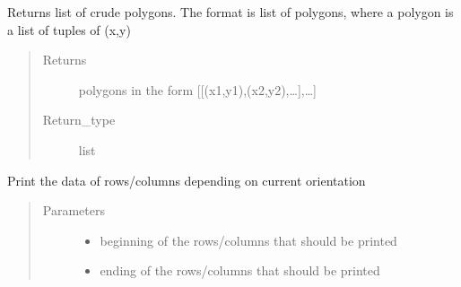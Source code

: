 \documentclass[a4paper,10pt,english]{sphinxmanual}
\begin{document}
\begin{fulllineitems}
\begin{fulllineitems}
\begin{quote}
\begin{description}
\end{description}\end{quote}

\end{fulllineitems}


\begin{fulllineitems}
\label{\detokenize{drc/drc:kppc.drc.kppc.drc.slcleaner.PyDrcSl.polygons}}
Returns list of crude polygons. The format is list of polygons, where a polygon is a list of tuples of (x,y)
\begin{quote}\begin{description}
\item[{Returns}] \leavevmode
polygons in the form {[}{[}(x1,y1),(x2,y2),…{]},…{]}

\item[{Return\_type}] \leavevmode
list

\end{description}\end{quote}

\end{fulllineitems}


\begin{fulllineitems}
\label{\detokenize{drc/drc:kppc.drc.kppc.drc.slcleaner.PyDrcSl.printvector}}
Print the data of rows/columns depending on current orientation
\begin{quote}\begin{description}
\item[{Parameters}] \leavevmode\begin{itemize}
\item {} 
 \textendash{} beginning of the rows/columns that should be printed

\item {} 
 \textendash{} ending of the rows/columns that should be printed

\end{itemize}


\end{description}
\end{quote}
\end{fulllineitems}
\end{fulllineitems}
\end{document}
